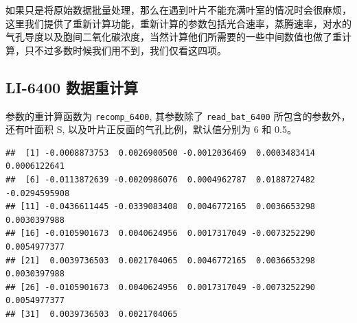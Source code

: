 \documentclass[
]{krantz}
\makeatletter
\newenvironment{Shaded}{\begin{snugshade}}{\end{snugshade}}
\newcommand{\AttributeTok}[1]{\textcolor[rgb]{0.77,0.63,0.00}{#1}}
\newcommand{\DecValTok}[1]{\textcolor[rgb]{0.00,0.00,0.81}{#1}}
\newcommand{\FloatTok}[1]{\textcolor[rgb]{0.00,0.00,0.81}{#1}}
\newcommand{\FunctionTok}[1]{\textcolor[rgb]{0.00,0.00,0.00}{#1}}
\newcommand{\NormalTok}[1]{#1}
\newcommand{\OtherTok}[1]{\textcolor[rgb]{0.56,0.35,0.01}{#1}}
\newcommand{\SpecialCharTok}[1]{\textcolor[rgb]{0.00,0.00,0.00}{#1}}
\newcommand{\StringTok}[1]{\textcolor[rgb]{0.31,0.60,0.02}{#1}}
\newenvironment{kframe}{%
\medskip{}
\setlength{\fboxsep}{.8em}
 \def\at@end@of@kframe{}%
 \ifinner\ifhmode%
  \def\at@end@of@kframe{\end{minipage}}%
  \begin{minipage}{\columnwidth}%
 \fi\fi%
 \def\FrameCommand##1{\hskip\@totalleftmargin \hskip-\fboxsep
 \colorbox{shadecolor}{##1}\hskip-\fboxsep
     \hskip-\linewidth \hskip-\@totalleftmargin \hskip\columnwidth}%
 \MakeFramed {\advance\hsize-\width
   \@totalleftmargin\z@ \linewidth\hsize
   \@setminipage}}%
 {\par\unskip\endMakeFramed%
 \at@end@of@kframe}
\renewenvironment{Shaded}{\begin{kframe}}{\end{kframe}}
\makeatother
\begin{document}
如果只是将原始数据批量处理，那么在遇到叶片不能充满叶室的情况时会很麻烦，这里我们提供了重新计算功能，重新计算的参数包括光合速率，蒸腾速率，对水的气孔导度以及胞间二氧化碳浓度，当然计算他们所需要的一些中间数值也做了重计算，只不过多数时候我们用不到，我们仅看这四项。

\hypertarget{recompute6400}{%
\subsection{LI-6400 数据重计算}\label{recompute6400}}

参数的重计算函数为 \texttt{recomp\_6400}, 其参数除了 \texttt{read\_bat\_6400} 所包含的参数外，还有叶面积 S, 以及叶片正反面的气孔比例，默认值分别为 6 和 0.5。

\begin{Shaded}
\end{Shaded}

\begin{verbatim}
##  [1] -0.0008873753  0.0026900500 -0.0012036469  0.0003483414  0.0006122641
##  [6] -0.0113872639 -0.0020986076  0.0004962787  0.0188727482 -0.0294595908
## [11] -0.0436611445 -0.0339083408  0.0046772165  0.0036653298  0.0030397988
## [16] -0.0105901673  0.0040624956  0.0017317049 -0.0073252290  0.0054977377
## [21]  0.0039736503  0.0021704065  0.0046772165  0.0036653298  0.0030397988
## [26] -0.0105901673  0.0040624956  0.0017317049 -0.0073252290  0.0054977377
## [31]  0.0039736503  0.0021704065
\end{verbatim}

\begin{Shaded}
\end{Shaded}
\end{document}
